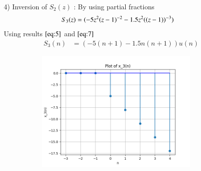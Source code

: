 \documentclass[journal,12pt,twocolumn]{IEEEtran}
\theoremstyle{remark}
\begin{document}
\begin{enumerate}
    \item[4)]
Inversion of $S_2(z)$ :
By using partial fractions 
\begin{align}
    S_3(z) &= \notag(-5z^2(z-1)^{-2} - 1.5z^2((z-1))^{-3}) 
\end{align}
Using results $\eqref{eq:5}$ and $\eqref{eq:7}$
\begin{align}
 S_3(n) &= (-5(n+1) - 1.5n(n+1))u(n)   
\end{align}
\begin{figure}[!ht]   
\centering
\graphicspath{ {figs/} }
\includegraphics[width=10cm, height=6cm]{graph_3}
\captionsetup{Graph:3 $x_3(n)$ vs n }
\label{graph:4}
\end{figure}

 
\end{enumerate}
\end{document}
